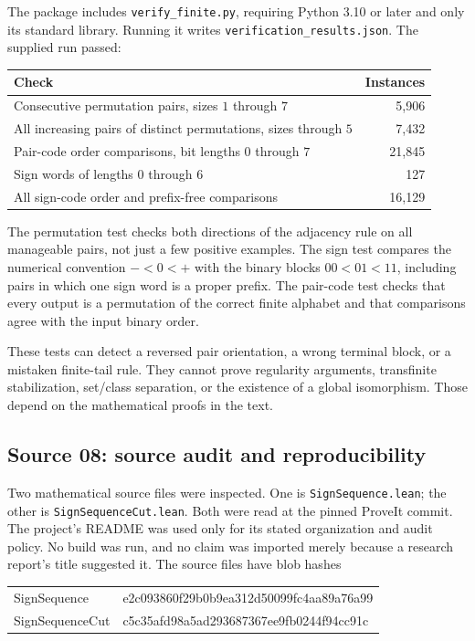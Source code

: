 \documentclass[11pt]{article}
\theoremstyle{definition}
\theoremstyle{remark}
\begin{document}
The package includes \texttt{verify\_finite.py}, requiring Python 3.10
or later and only its standard library. Running it writes
\texttt{verification\_results.json}. The supplied run passed:
\begin{center}
\small
\begin{tabularx}{\textwidth}{@{}Y r@{}}
\toprule
Check & Instances \\
\midrule
Consecutive permutation pairs, sizes $1$ through $7$ & 5,906 \\
All increasing pairs of distinct permutations, sizes through $5$ & 7,432 \\
Pair-code order comparisons, bit lengths $0$ through $7$ & 21,845 \\
Sign words of lengths $0$ through $6$ & 127 \\
All sign-code order and prefix-free comparisons & 16,129 \\
\bottomrule
\end{tabularx}
\end{center}

The permutation test checks both directions of the adjacency rule on
all manageable pairs, not just a few positive examples. The sign test
compares the numerical convention $-<0<+$ with the binary blocks
$00<01<11$, including pairs in which one sign word is a proper prefix.
The pair-code test checks that every output is a permutation of the
correct finite alphabet and that comparisons agree with the input
binary order.

These tests can detect a reversed pair orientation, a wrong terminal
block, or a mistaken finite-tail rule. They cannot prove regularity
arguments, transfinite stabilization, set/class separation, or the
existence of a global isomorphism. Those depend on the mathematical
proofs in the text.

\subsection{Source 08: source audit and reproducibility}\label{swo:sk:app:sources}

Two mathematical source files were inspected. One is
\texttt{SignSequence.lean}; the other is
\texttt{SignSequenceCut.lean}.
Both were read at the pinned ProveIt commit. The project's README was used only for its
stated organization and audit policy. No build was run, and no claim
was imported merely because a research report's title suggested it.
The source files have blob hashes
\begin{center}\small\ttfamily
\begin{tabular}{ll}
SignSequence & e2c093860f29b0b9ea312d50099fc4aa89a76a99 \\
SignSequenceCut & c5c35afd98a5ad293687367ee9fb0244f94cc91c
\end{tabular}
\end{center}
\end{document}
